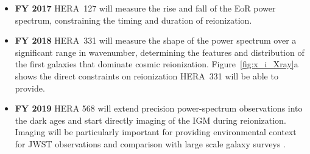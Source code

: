 \documentclass[preprint]{aastex}
\begin{document}


\begin{itemize}\setlength{\parskip}{0pt}\itemsep0pt

\item {\bf FY 2017} HERA~127 will measure the rise and fall of the EoR power spectrum, constraining the timing and duration of reionization.

\item {\bf FY 2018} HERA~331 will measure the shape of the power spectrum over a significant range in wavenumber, determining the features and distribution of the first galaxies that dominate cosmic reionization. Figure~\ref{fig:x_i_Xray}a shows the direct constraints on reionization HERA~331 will be able to provide.


\item {\bf FY 2019} HERA 568 will extend precision power-spectrum observations into the dark ages and start directly imaging of the IGM during reionization. Imaging will be particularly important for providing environmental context for JWST observations and comparison with large scale galaxy surveys .
\end{itemize}
\end{document}
